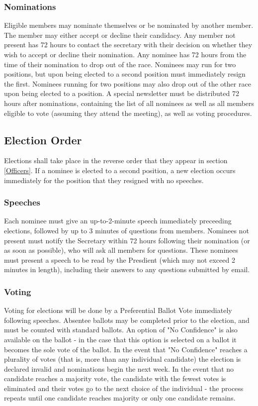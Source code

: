 \documentclass{article}
\begin{document}
\subsubsection{Nominations}
Eligible members may nominate themselves or be nominated by another member.  The member may either accept or decline their candidacy.  Any member not present has 72 hours to contact the secretary with their decision on whether they wish to accept or decline their nomination.  Any nominee has 72 hours from the time of their nomination to drop out of the race.  Nominees may run for two positions, but upon being elected to a second position must immediately resign the first.  Nominees running for two positions may also drop out of the other race upon being elected to a position.  A special newsletter must be distributed 72 hours after nominations, containing the list of all nominees as well as all members eligible to vote (assuming they attend the meeting), as well as voting procedures.
\subsection{Election Order}
Elections shall take place in the reverse order that they appear in section \ref{Officers}.  If a nominee is elected to a second position, a new election occurs immediately for the position that they resigned with no speeches.
\subsubsection{Speeches}
Each nominee must give an up-to-2-minute speech immediately preceeding elections, followed by up to 3 minutes of questions from members.  Nominees not present must notify the Secretary within 72 hours following their nomination (or as soon as possible), who will ask all members for questions. These nominees must present a speech to be read by the Presdient (which may not exceed 2 minutes in length), including their answers to any questions submitted by email.
\subsubsection{Voting}
Voting for elections will be done by a Preferential Ballot Vote immediately following speeches.  Absentee ballots may be completed prior to the election, and must be counted with standard ballots.  An option of "No Confidence" is also available on the ballot - in the case that this option is selected on a ballot it becomes the sole vote of the ballot.  In the event that "No Confidence" reaches a plurality of votes (that is, more than any individual candidate) the election is declared invalid and nominations begin the next week.  In the event that no candidate reaches a majority vote, the candidate with the fewest votes is eliminated and their votes go to the next choice of the individual - the process repeats until one candidate reaches majority or only one candidate remains.
\end{document}
